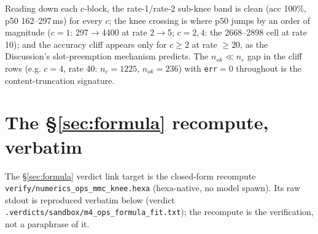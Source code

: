 \documentclass[11pt,a4paper]{article}
\begin{document}
\noindent Reading down each \(c\)-block, the rate-1/rate-2 sub-knee band is clean
(acc 100\%, p50 162--297\,ms) for every \(c\); the knee crossing is where p50
jumps by an order of magnitude (\(c{=}1\): 297\(\to\)4400 at rate 2\(\to\)5;
\(c{=}2,4\): the 2668--2898 cell at rate 10); and the accuracy cliff appears only
for \(c\ge2\) at rate \(\ge20\), as the Discussion's slot-preemption mechanism
predicts. The \(n_{ok}\!\ll\!n_c\) gap in the cliff rows (e.g. \(c{=}4\), rate 40:
\(n_c{=}1225\), \(n_{ok}{=}236\)) with \texttt{err}\(=0\) throughout is the
content-truncation signature.

\section{The \S\ref{sec:formula} recompute, verbatim}
\label{app:recompute}
The \S\ref{sec:formula} verdict link target is the closed-form recompute
\texttt{verify/numerics\_ops\_mmc\_knee.hexa} (hexa-native, no model spawn). Its
raw stdout is reproduced verbatim below (verdict
\texttt{.verdicts/sandbox/m4\_ops\_formula\_fit.txt}); the recompute is the
verification, not a paraphrase of it.
\end{document}
